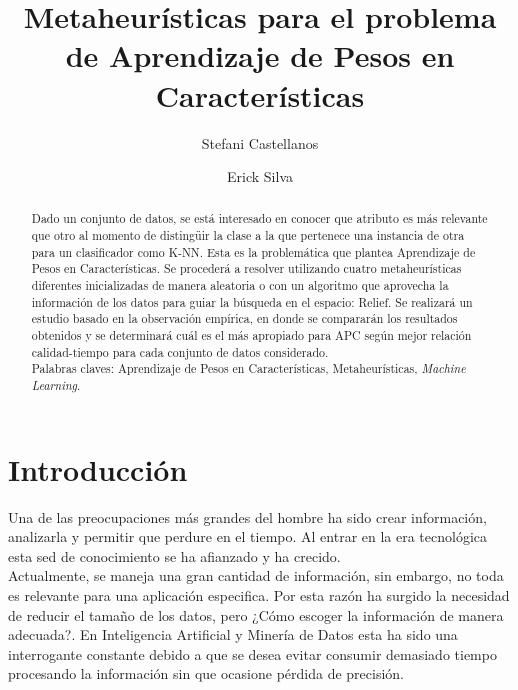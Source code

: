 \documentclass{ci5652}
\title{Metaheurísticas para el problema de Aprendizaje de Pesos en Características}
\author{Stefani Castellanos
        \and
        Erick Silva}
\begin{document}
\thispagestyle{empty}
\maketitle


\begin{abstract}

{\small Dado un conjunto de datos, se está interesado en conocer que atributo es
más relevante que otro al momento de distingüir la clase a la que pertenece una
instancia de otra para un clasificador como K-NN. Esta es la problemática que
plantea Aprendizaje de Pesos en Características. Se procederá a resolver
utilizando cuatro metaheurísticas diferentes inicializadas de manera aleatoria o
con un algoritmo que aprovecha la información de los datos para guiar la
búsqueda en el espacio: Relief. Se realizará un estudio basado en la observación
empírica, en donde se compararán los resultados obtenidos y se determinará cuál
es el más apropiado para APC según mejor relación calidad-tiempo para cada
conjunto de datos considerado.\\

Palabras claves: Aprendizaje de Pesos en Características, Metaheurísticas,
\textit{Machine Learning}}.

\end{abstract}


\section*{Introducción}

Una de las preocupaciones más grandes del hombre ha sido crear información,
analizarla y permitir que perdure en el tiempo. Al entrar en la era tecnológica
esta sed de conocimiento se ha afianzado y ha crecido.\\

Actualmente, se maneja una gran cantidad de información, sin embargo, no toda es
relevante para una aplicación especifica. Por esta razón ha surgido la necesidad
de reducir el tamaño de los datos, pero ¿Cómo escoger la información de manera
adecuada?. En Inteligencia Artificial y Minería de Datos esta ha sido una
interrogante constante debido a que se desea evitar consumir demasiado tiempo
procesando la información sin que ocasione pérdida de precisión.\\
\end{document}
